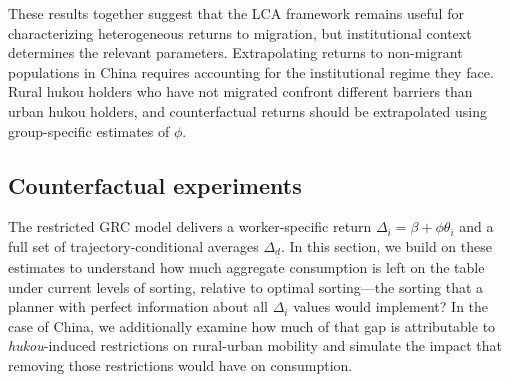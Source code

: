 
These results together suggest that the LCA framework remains useful for characterizing heterogeneous returns to migration, but institutional context determines the relevant parameters.
Extrapolating returns to non-migrant populations in China requires accounting for the institutional regime they face.
Rural hukou holders who have not migrated confront different barriers than urban hukou holders, and counterfactual returns should be extrapolated using group-specific estimates of $\phi$.




\subsection{Counterfactual experiments}\label{sec:counterfactuals}

The restricted GRC model delivers a worker-specific return $\Delta_i = \beta + \phi\theta_i$ and a full set of trajectory-conditional averages $\Delta_{\underline{d}}$.
In this section, we build on these estimates to understand how much aggregate consumption is left on the table under current levels of sorting, relative to optimal sorting---the sorting that a planner with perfect information about all $\Delta_i$ values would implement?
In the case of China, we additionally examine how much of that gap is attributable to \textit{hukou}-induced restrictions on rural-urban mobility and simulate the impact that removing those restrictions would have on consumption.

